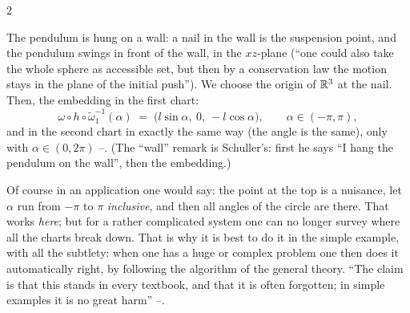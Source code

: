 \begin{paracol}{2}
\begin{nfigure}
\caption*{The plane pendulum: the wall is the $xz$-plane, $\alpha=0$ is the pendulum hanging down, so $h(\alpha)=(l\sin\alpha,\,0,\,-l\cos\alpha)$.}
\end{nfigure}
The pendulum is hung on a wall: a nail in the wall is the suspension point, and the pendulum swings in front of the wall, in the $xz$-plane (``one could also take the whole sphere as accessible set, but then by a conservation law the motion stays in the plane of the initial push''). We choose the origin of $\mathbb{R}^3$ at the nail. Then, the embedding in the first chart:
\begin{equation}\label{eq:pc-h}
  \omega\circ h\circ\tilde\omega_1^{-1}(\alpha)\;=\;\bigl(l\sin\alpha,\ 0,\ -l\cos\alpha\bigr),\qquad\alpha\in(-\pi,\pi),
\end{equation}
and in the second chart in exactly the same way (the angle is the same), only with $\alpha\in(0,2\pi)$ --. (The ``wall'' remark is Schuller's: first he says ``I hang the pendulum on the wall'', then the embedding.)

\begin{coursenote}\label{cn:pc-twocharts}
Of course in an application one would say: the point at the top is a nuisance, let $\alpha$ run from $-\pi$ to $\pi$ \emph{inclusive}, and then all angles of the circle are there. That works \emph{here}; but for a rather complicated system one can no longer survey where all the charts break down. That is why it is best to do it in the simple example, with all the subtlety: when one has a huge or complex problem one then does it automatically right, by following the algorithm of the general theory. ``The claim is that this stands in every textbook, and that it is often forgotten; in simple examples it is no great harm'' --.
\end{coursenote}


\end{paracol}
